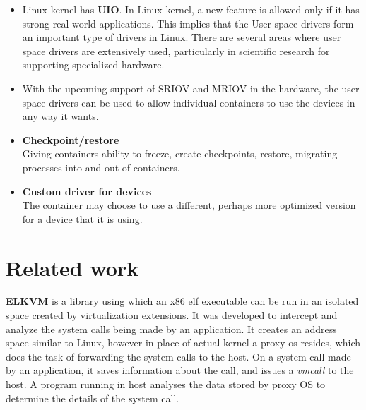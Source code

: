 \documentclass[twoside]{iitbreport}
\begin{document}
\begin{itemize}
\item Linux kernel has \textbf{UIO}. In Linux kernel, a new feature is allowed only if it has strong real world applications. This implies that the User space drivers form an important type of drivers in Linux. There are several areas where user space drivers are extensively used, particularly in scientific research for supporting specialized hardware. 
\item With the upcoming support of SRIOV and MRIOV in the hardware, the user space drivers can be used to allow individual containers to use the devices in any way it wants.
\item \textbf{Checkpoint/restore}\\
Giving containers ability to freeze, create checkpoints, restore, migrating processes into and out of containers.
\item \textbf{Custom driver for devices}\\
The container may choose to use a different, perhaps more optimized version for a device that it is using.
\end{itemize}


\chapter{Related work}
\textbf{ELKVM}\cite{pester2014elk} is a library using which an x86 elf executable can be run in an isolated space created by virtualization extensions. It was developed to intercept and analyze the system calls being made by an application. It creates an address space similar to Linux, however in place of actual kernel a proxy os resides, which does the task of forwarding the system calls to the host. On a system call made by an application, it saves information about the call, and issues a \textit{vmcall} to the host. A program running in host analyses the data stored by proxy OS to determine the details of the system call.\\
\end{document}
